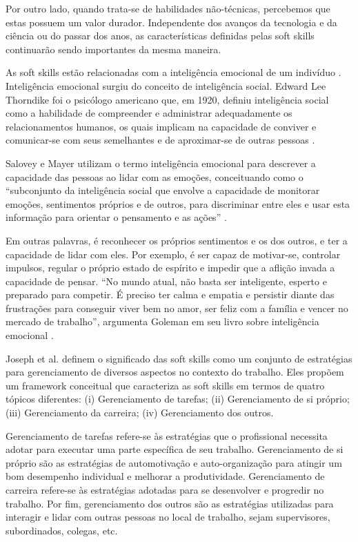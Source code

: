 Por outro lado, quando trata-se de habilidades não-técnicas, percebemos que estas possuem um valor durador. Independente dos avanços da tecnologia e da ciência ou do passar dos anos, as características definidas pelas soft skills continuarão sendo importantes da mesma maneira.

As soft skills estão relacionadas com a inteligência emocional de um indivíduo \cite{hjyunus:12}. Inteligência emocional surgiu do conceito de inteligência social. Edward Lee Thorndike foi o psicólogo americano que, em 1920, definiu inteligência social como a habilidade de compreender e administrar adequadamente os relacionamentos humanos, os quais implicam na capacidade de conviver e comunicar-se com seus semelhantes e de aproximar-se de outras pessoas \cite{thornlike:20}.

Salovey e Mayer utilizam o termo inteligência emocional para descrever a capacidade das pessoas ao lidar com as emoções, conceituando como o ``subconjunto da inteligência social que envolve a capacidade de monitorar emoções, sentimentos próprios e de outros, para discriminar entre eles e usar esta informação para orientar o pensamento e as ações'' \cite{salovey:90}.

Em outras palavras, é reconhecer os próprios sentimentos e os dos outros, e ter a capacidade de lidar com eles. Por exemplo, é ser capaz de motivar-se, controlar impulsos, regular o próprio estado de espírito e impedir que a aflição invada a capacidade de pensar. ``No mundo atual, não basta ser inteligente, esperto e preparado para competir. É preciso ter calma e empatia e persistir diante das frustrações para conseguir viver bem no amor, ser feliz com a família e vencer no mercado de trabalho'', argumenta Goleman em seu livro sobre inteligência emocional \cite{goleman:07}.

Joseph et al. \cite{joseph:99, joseph:10} definem o significado das soft skills como um conjunto de estratégias para gerenciamento de diversos aspectos no contexto do trabalho. Eles propõem um framework conceitual que caracteriza as soft skills em termos de quatro tópicos diferentes: (i) Gerenciamento de tarefas; (ii) Gerenciamento de si próprio; (iii) Gerenciamento da carreira; (iv) Gerenciamento dos outros.

Gerenciamento de tarefas refere-se às estratégias que o profissional necessita adotar para executar uma parte específica de seu trabalho. Gerenciamento de si próprio são as estratégias de automotivação e auto-organização para atingir um bom desempenho individual e melhorar a produtividade. Gerenciamento de carreira refere-se às estratégias adotadas para se desenvolver e progredir no trabalho. Por fim, gerenciamento dos outros são as estratégias utilizadas para interagir e lidar com outras pessoas no local de trabalho, sejam supervisores, subordinados, colegas, etc.

